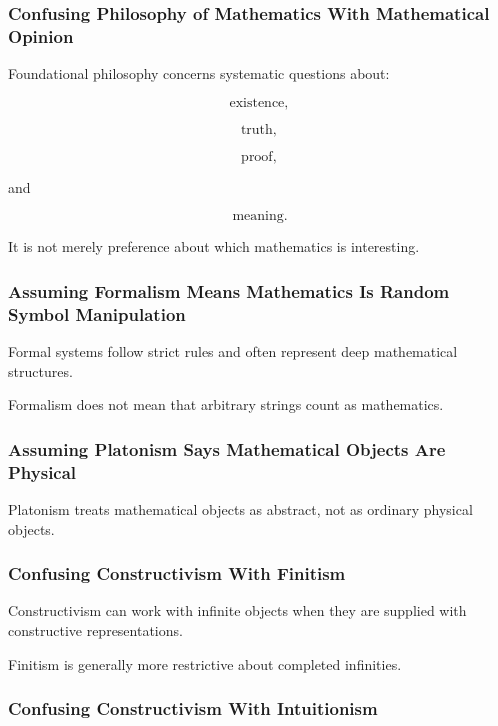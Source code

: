 \subsubsection{Confusing Philosophy of Mathematics With Mathematical Opinion}

Foundational philosophy concerns systematic questions about:

\[
\boxed{
\text{existence},
}
\]

\[
\boxed{
\text{truth},
}
\]

\[
\boxed{
\text{proof},
}
\]

and

\[
\boxed{
\text{meaning}.
}
\]

It is not merely preference about which mathematics is interesting.

\subsubsection{Assuming Formalism Means Mathematics Is Random Symbol Manipulation}

Formal systems follow strict rules and often represent deep mathematical
structures.

Formalism does not mean that arbitrary strings count as mathematics.

\subsubsection{Assuming Platonism Says Mathematical Objects Are Physical}

Platonism treats mathematical objects as abstract, not as ordinary physical
objects.

\subsubsection{Confusing Constructivism With Finitism}

Constructivism can work with infinite objects when they are supplied with
constructive representations.

Finitism is generally more restrictive about completed infinities.

\subsubsection{Confusing Constructivism With Intuitionism}


